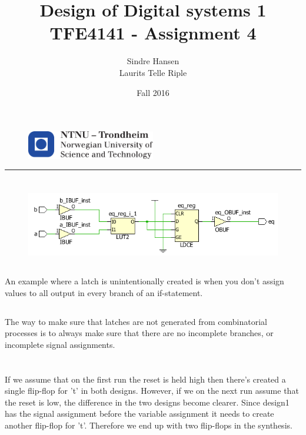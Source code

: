 \documentclass{article}
\title{Design of Digital systems 1 TFE4141 - Assignment 4}
\author{Sindre Hansen \\ Laurits Telle Riple}
\date{Fall 2016}
\begin{document}
\begin{figure}
  \centering
  \includegraphics[width=0.5\textwidth]{images/logontnu_eng}
\end{figure}
\maketitle
\rule{\linewidth}{0.5mm}

\section{}
\subsection{}
\begin{figure}[hbp]
  \centering
  \includegraphics[width=\textwidth]{images/task1-1}
\end{figure}

\subsection{}
An example where a latch is unintentionally created is when you don't
assign values to all output in every branch of an if-statement.

\subsection{}
The way to make sure that latches are not generated from combinatorial
processes is to always make sure that there are no incomplete
branches, or incomplete signal assignments.

\section{}
\subsection{}
If we assume that on the first run the reset is held high then there's
created a single flip-flop for 't' in both designs. However, if we on
the next run assume that the reset is low, the difference in the two
designs become clearer. Since design1 has the signal assignment before
the variable assignment it needs to create another flip-flop for
't'. Therefore we end up with two flip-flops in the synthesis.
\end{document}
